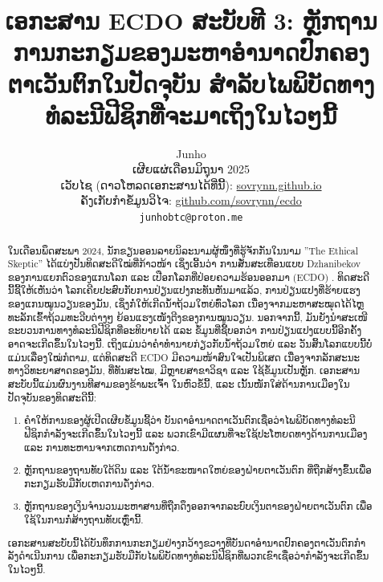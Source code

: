 \documentclass[10pt,twocolumn,letterpaper]{article}
\begin{document}
\title{ເອກະສານ ECDO ສະບັບທີ 3: ຫຼັກຖານການກະກຽມຂອງມະຫາອຳນາດປົກຄອງຕາເວັນຕົກໃນປັດຈຸບັນ ສໍາລັບໄພພິບັດທາງທໍລະນີຟີຊິກທີ່ຈະມາເຖິງໃນໄວໆນີ້}

\author{Junho\\
ເຜີຍແຜ່ເດືອນມິຖຸນາ 2025\\
ເວັບໄຊ (ດາວໂຫລດເອກະສານໄດ້ທີ່ນີ້): \href{https://sovrynn.github.io}{sovrynn.github.io}\\
ຄັງເກັບກຳຂໍ້ມູນວິໄຈ: \href{https://github.com/sovrynn/ecdo}{github.com/sovrynn/ecdo}\\
{\tt\small junhobtc@proton.me}
}

\maketitle

\begin{abstract}
ໃນເດືອນພຶດສະພາ 2024, ນັກຂຽນອອນລາຍນິລະນາມຜູ້ໜຶ່ງທີ່ຮູ້ຈັກກັນໃນນາມ ”The Ethical Skeptic” \cite{0} ໄດ້ແບ່ງປັນທິດສະດີໃໝ່ທີ່ກ້າວໜ້າ ເຊິ່ງເອີ້ນວ່າ ການສັ່ນສະເທືອນແບບ Dzhanibekov ຂອງການແຍກຕົວຂອງແກນໂລກ ແລະ ເປືອກໂລກທີ່ປ່ອຍຄວາມຮ້ອນອອກມາ (ECDO) \cite{1}.
ທິດສະດີນີ້ຊີ້ໃຫ້ເຫັນວ່າ ໂລກເຄີຍປະສົບກັບການປ່ຽນແປງກະທັນຫັນມາແລ້ວ, ການປ່ຽນແປງທີ່ຮ້າຍແຮງຂອງແກນໝູນວຽນຂອງມັນ, ເຊິ່ງກໍ່ໃຫ້ເກີດນໍ້າຖ້ວມໃຫຍ່ທົ່ວໂລກ ເນື່ອງຈາກມະຫາສະໝຸດໄດ້ໄຫຼທະລັກເຂົ້າຖ້ວມທະວີບຕ່າງໆ ຍ້ອນແຮງເໜັງຕີງຂອງການໝູນວຽນ. ນອກຈາກນີ້, ມັນຍັງນຳສະເໜີຂະບວນການທາງທໍລະນີຟີຊິກທີ່ອະທິບາຍໄດ້ ແລະ ຂໍ້ມູນທີ່ຊີ້ບອກວ່າ ການປ່ຽນແປງແບບນີ້ອີກຄັ້ງອາດຈະເກີດຂຶ້ນໃນໄວໆນີ້. \cite{92}
ເຖິງແມ່ນວ່າຄຳທຳນາຍກ່ຽວກັບນໍ້າຖ້ວມໃຫຍ່ ແລະ ວັນສິ້ນໂລກແບບນີ້ບໍ່ແມ່ນເລື່ອງໃໝ່ກໍຕາມ, ແຕ່ທິດສະດີ ECDO ມີຄວາມໜ້າສົນໃຈເປັນພິເສດ ເນື່ອງຈາກລັກສະນະທາງວິທະຍາສາດຂອງມັນ, ທີ່ທັນສະໄໝ, ມີຫຼາຍສາຂາວິຊາ ແລະ ໃຊ້ຂໍ້ມູນເປັນຫຼັກ. \cite{93}
ເອກະສານສະບັບນີ້ແມ່ນຜົນງານທີສາມຂອງຂ້າພະເຈົ້າ \cite{2,3} ໃນຫົວຂໍ້ນີ້, ແລະ ເນັ້ນໜັກໃສ່ດ້ານການເມືອງໃນປັດຈຸບັນຂອງທິດສະດີນີ້: \cite{94}
\begin{flushleft}
\begin{enumerate}
    \item ຄໍາໃຫ້ການຂອງຜູ້ເປີດເຜີຍຂໍ້ມູນຊີ້ວ່າ ບັນດາອໍານາດຕາເວັນຕົກເຊື່ອວ່າໄພພິບັດທາງທໍລະນີຟີຊິກກຳລັງຈະເກີດຂຶ້ນໃນໄວໆນີ້ ແລະ ພວກເຂົາມີແຜນທີ່ຈະໃຊ້ປະໂຫຍດທາງດ້ານການເມືອງ ແລະ ການທະຫານຈາກເຫດການດັ່ງກ່າວ.
    \item ຫຼັກຖານຂອງຖານທັບໃຕ້ດິນ ແລະ ໃຕ້ນໍ້າຂະໜາດໃຫຍ່ຂອງຝ່າຍຕາເວັນຕົກ ທີ່ຖືກສ້າງຂຶ້ນເພື່ອກະກຽມຮັບມືກັບເຫດການດັ່ງກ່າວ.
    \item ຫຼັກຖານຂອງເງິນຈໍານວນມະຫາສານທີ່ຖືກດຶງອອກຈາກລະບົບເງິນຕາຂອງຝ່າຍຕາເວັນຕົກ ເພື່ອໃຊ້ໃນການກໍ່ສ້າງຖານທັບເຫຼົ່ານີ້. \cite{95}
\end{enumerate}
\end{flushleft}

ເອກະສານສະບັບນີ້ໄດ້ບັນທຶກການກະກຽມຢ່າງກວ້າງຂວາງທີ່ບັນດາອຳນາດປົກຄອງຕາເວັນຕົກກຳລັງດໍາເນີນການ ເພື່ອກະກຽມຮັບມືກັບໄພພິບັດທາງທໍລະນີຟີຊິກທີ່ພວກເຂົາເຊື່ອວ່າກຳລັງຈະເກີດຂຶ້ນໃນໄວໆນີ້.
\end{abstract}
\end{document}
